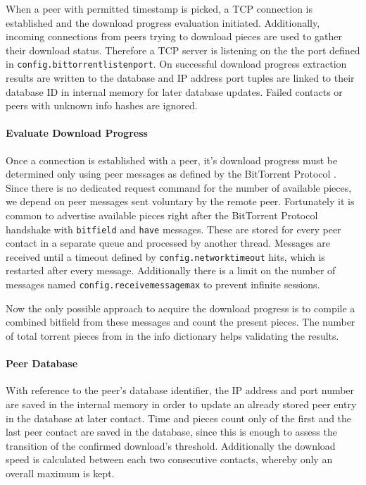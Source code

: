 \documentclass[10pt, a4paper, twoside]{scrartcl}
\renewcommand{\_}{\origunderscore\allowbreak}
\newcommand{\config}[1]{\texttt{config.\allowbreak #1}}
\begin{document}
When a peer with permitted timestamp is picked, a TCP connection is established and the download progress evaluation initiated. Additionally, incoming connections from peers trying to download pieces are used to gather their download status. Therefore a TCP server is listening on the the port defined in \config{bittorrent\_listen\_port}. On successful download progress extraction results are written to the database and IP address port tuples are linked to their database ID in internal memory for later database updates. Failed contacts or peers with unknown info hashes are ignored.

\paragraph{Evaluate Download Progress}
Once a connection is established with a peer, it's download progress must be determined only using peer messages as defined by the BitTorrent Protocol \cite{bep3}. Since there is no dedicated request command for the number of available pieces, we depend on peer messages sent voluntary by the remote peer. Fortunately it is common to advertise available pieces right after the BitTorrent Protocol handshake with \texttt{bitfield} and \texttt{have} messages. These are stored for every peer contact in a separate queue and processed by another thread. Messages are received until a timeout defined by \config{network\_timeout} hits, which is restarted after every message. Additionally there is a limit on the number of messages named \config{receive\_message\_max} to prevent infinite sessions.

Now the only possible approach to acquire the download progress is to compile a combined bitfield from these messages and count the present pieces. The number of total torrent pieces from in the info dictionary helps validating the results.

\paragraph{Peer Database}
With reference to the peer's database identifier, the IP address and port number are saved in the internal memory in order to update an already stored peer entry in the database at later contact. Time and pieces count only of the first and the last peer contact are saved in the database, since this is enough to assess the transition of the confirmed download's threshold. Additionally the download speed is calculated between each two consecutive contacts, whereby only an overall maximum is kept.
\end{document}
